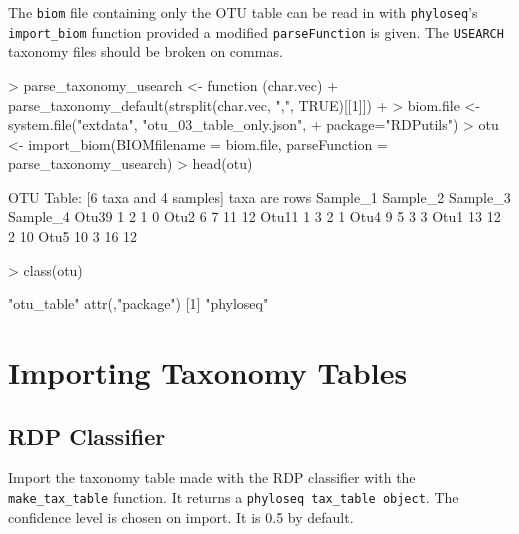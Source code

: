 \documentclass{article}
\begin{document}
The \texttt{biom} file containing only the OTU table can be read in with \texttt{phyloseq}'s \texttt{import\_biom} function provided a modified \texttt{parseFunction} is given. The \texttt{USEARCH} taxonomy files should be broken on commas.    

\begin{Schunk}
\begin{Sinput}
> parse_taxonomy_usearch <- function (char.vec){
+   parse_taxonomy_default(strsplit(char.vec, ",", TRUE)[[1]])
+ }
> biom.file <- system.file("extdata", "otu_03_table_only.json",
+                         package="RDPutils")
> otu <- import_biom(BIOMfilename = biom.file, parseFunction = parse_taxonomy_usearch)
> head(otu)
\end{Sinput}
\begin{Soutput}
OTU Table:          [6 taxa and 4 samples]
                     taxa are rows
      Sample_1 Sample_2 Sample_3 Sample_4
Otu39        1        2        1        0
Otu2         6        7       11       12
Otu11        1        3        2        1
Otu4         9        5        3        3
Otu1        13       12        2       10
Otu5        10        3       16       12
\end{Soutput}
\begin{Sinput}
> class(otu)
\end{Sinput}
\begin{Soutput}
[1] "otu_table"
attr(,"package")
[1] "phyloseq"
\end{Soutput}
\end{Schunk}

\section*{Importing Taxonomy Tables}

\subsection*{RDP Classifier}

Import the taxonomy table made with the RDP classifier with the \texttt{make\_tax\_table} function. It returns a \texttt{phyloseq tax\_table object}. The confidence level is chosen on import. It is 0.5 by default.    
\end{document}
